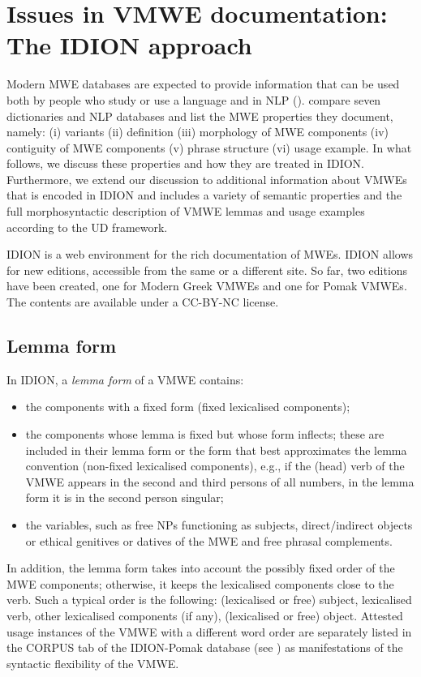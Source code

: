 \documentclass[output=paper,colorlinks,citecolor=brown]{langscibook}
\begin{document}
\section{Issues in VMWE documentation: The IDION approach}
\label{sec:idion}


Modern MWE databases are expected to provide information that can be used both by people who study or use a language and in NLP (\cite{duelme, Gyri2016}).  \citet{Gantar2018} compare seven dictionaries and NLP databases and list the  MWE properties they document, namely: (i) variants (ii) definition (iii) morphology of MWE components (iv) contiguity of MWE components (v) phrase structure (vi)  usage example. In what follows, we discuss these properties and how they are treated in IDION. Furthermore,  we extend our discussion to additional information about VMWEs that is encoded in IDION and includes a variety of semantic properties and the full morphosyntactic description of VMWE lemmas and usage examples according to the UD framework.


IDION is a web environment for the rich documentation of MWEs.  IDION allows for new editions, accessible from the same or a different site. So far, two editions have been created, one for  Modern Greek VMWEs  \citep{markantonatou-etal-2019-idion} and one for Pomak  VMWEs. The contents are available under a CC-BY-NC license.

\subsection{Lemma form}
\label{sec:lemmaform}

In IDION, a \textit{lemma form} of a VMWE contains:
\begin{itemize}
\item the components with a fixed form (fixed lexicalised components);
\item the components whose lemma is fixed but whose form inflects; these are included  in their lemma form or the form that best approximates the lemma convention (non-fixed lexicalised components), e.g., if the (head) verb of the VMWE appears in the second and third persons of all numbers, in the lemma form it is in the second person singular;
\item the variables, such as free NPs functioning as subjects, direct/indirect objects or ethical genitives or datives of the MWE and free phrasal complements.
\end{itemize}

In addition, the lemma form takes into account the possibly fixed order of the MWE components; otherwise, it keeps the lexicalised components close to the verb. Such a typical order is the following: (lexicalised or free) subject, lexicalised verb, other lexicalised components (if any), (lexicalised or free) object.  Attested usage instances of the VMWE with a different word order are separately listed in the \textsc{CORPUS} tab of the IDION-Pomak database (see ) as manifestations of the syntactic flexibility of the VMWE.
\end{document}
